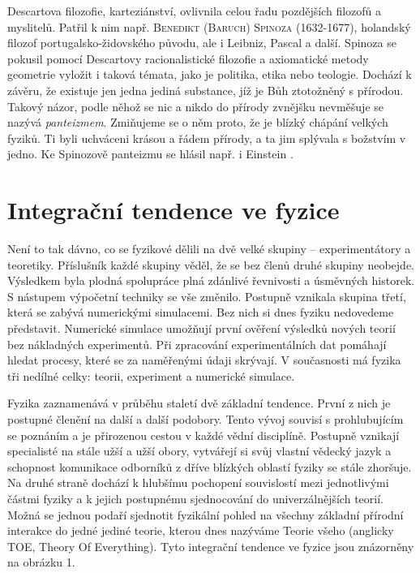     Descartova filozofie, karteziánství, ovlivnila celou řadu pozdějších filozofů a myslitelů.
    Patřil k nim např. \textsc{Benedikt (Baruch) Spinoza} (1632-1677), holandský filozof
    portugalsko-židovského původu, ale i Leibniz, Pascal a další. Spinoza se pokusil pomocí
    Descartovy racionalistické filozofie a axiomatické metody geometrie vyložit i taková témata,
    jako je politika, etika nebo teologie. Dochází k závěru, že existuje jen jedna jediná substance,
    jíž je Bůh ztotožněný s přírodou. Takový názor, podle něhož se nic a nikdo do přírody zvnějšku
    nevměšuje se nazývá \emph{panteizmem}. Zmiňujeme se o něm proto, že je blízký chápání velkých
    fyziků. Ti byli uchváceni krásou a řádem přírody, a ta jim splývala s božstvím v jedno. Ke
    Spinozově panteizmu se hlásil např. i Einstein \cite[s.~141]{Stoll2009}.    
    
  \section{Integrační tendence ve fyzice}\label{fyz:IchapIsecVIII}
    Není to tak dávno, co se fyzikové dělili na dvě velké skupiny – experimentátory a teoretiky.
    Příslušník každé skupiny věděl, že se bez členů druhé skupiny neobejde. Výsledkem byla plodná
    spolupráce plná zdánlivé řevnivosti a úsměvných historek. S nástupem výpočetní techniky se vše
    změnilo. Postupně vznikala skupina třetí, která se zabývá numerickými simulacemi. Bez nich si
    dnes fyziku nedovedeme představit. Numerické simulace umožňují první ověření výsledků nových
    teorií bez nákladných experimentů. Při zpracování experimentálních dat pomáhají hledat procesy,
    které se za naměřenými údaji skrývají. V současnosti má fyzika tři nedílné celky: teorii,
    experiment a numerické simulace. 
    
    Fyzika zaznamenává v průběhu staletí dvě základní tendence. První z nich je postupné členění na
    další a další podobory. Tento vývoj souvisí s prohlubujícím se poznáním a je přirozenou cestou v
    každé vědní disciplíně. Postupně vznikají specialisté na stále užší a užší obory, vytvářejí si
    svůj vlastní vědecký jazyk a schopnost komunikace odborníků z dříve blízkých oblastí fyziky se
    stále zhoršuje. Na druhé straně dochází k hlubšímu pochopení souvislostí mezi jednotlivými
    částmi fyziky a k jejich postupnému sjednocování do univerzálnějších teorií. Možná se jednou
    podaří sjednotit fyzikální pohled na všechny základní přírodní interakce do jedné jediné teorie,
    kterou dnes nazýváme Teorie všeho (anglicky TOE, Theory Of Everything). Tyto integrační tendence
    ve fyzice jsou znázorněny na obrázku 1. 

